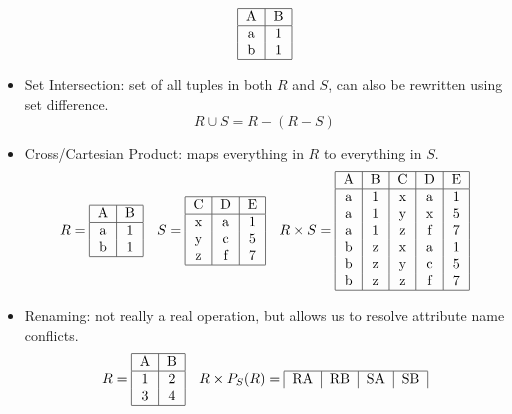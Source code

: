 \documentclass{math}
\begin{document}
\begin{itemize}
\[\begin{tabular}{|c|c|}
      \hline
      A & B \\
      \hline
      a & 1 \\
      b & 1 \\
      \hline
    \end{tabular} \]
  \item Set Intersection: set of all tuples in both \( R \) and \( S \), can
    also be rewritten using set difference.
    \[ R\cup S = R-(R-S) \]
  \item Cross/Cartesian Product: maps everything in \( R \) to everything in
    \( S \).
    \[ R = \begin{tabular}{|c|c|}
      \hline
      A & B \\
      \hline
      a & 1 \\
      b & 1 \\
      \hline
    \end{tabular} \quad
    S = \begin{tabular}{|c|c|c|}
      \hline
      C & D & E \\
      \hline
      x & a & 1 \\
      y & c & 5 \\
      z & f & 7 \\
      \hline
    \end{tabular} \quad
    R\times S = \begin{tabular}{|c|c|c|c|c|}
      \hline
      A & B & C & D & E \\
      \hline
      a & 1 & x & a & 1 \\
      a & 1 & y & x & 5 \\
      a & 1 & z & f & 7 \\
      b & z & x & a & 1 \\
      b & z & y & c & 5 \\
      b & z & z & f & 7 \\
      \hline
    \end{tabular} \]
  \item Renaming: not really a real operation, but allows us to resolve
    attribute name conflicts.
    \[ R = \begin{tabular}{|c|c|}
      \hline
      A & B \\
      \hline
      1 & 2 \\
      3 & 4 \\
      \hline
    \end{tabular} \quad
    R\times P_S(R) = \begin{tabular}{|c|c|c|c|}
      \hline
      RA & RB & SA & SB \\

\end{tabular}\]
\end{itemize}
\end{document}
